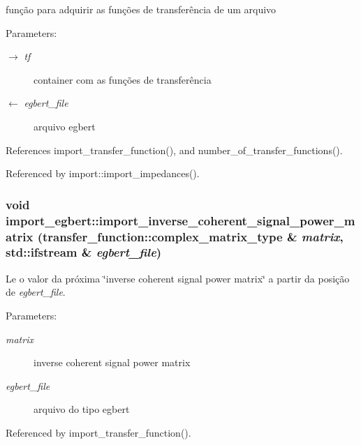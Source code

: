 função para adquirir as funções de transferência de um arquivo 

\begin{Desc}
\item[Parameters:]
\begin{description}
\item[\mbox{$\rightarrow$} {\em tf}]container com as funções de transferência \item[\mbox{$\leftarrow$} {\em egbert\_\-file}]arquivo egbert \end{description}
\end{Desc}


References import\_\-transfer\_\-function(), and number\_\-of\_\-transfer\_\-functions().

Referenced by import::import\_\-impedances().
\subsubsection{\setlength{\rightskip}{0pt plus 5cm}void import\_\-egbert::import\_\-inverse\_\-coherent\_\-signal\_\-power\_\-matrix (transfer\_\-function::complex\_\-matrix\_\-type \& {\em matrix}, \/  std::ifstream \& {\em egbert\_\-file})}\label{namespaceimport__egbert_27ca661a9f34ba331e928c034bcae7e3}


Le o valor da próxima \char`\"{}inverse coherent signal power matrix\char`\"{} a partir da posição de {\em egbert\_\-file\/}. 

\begin{Desc}
\item[Parameters:]
\begin{description}
\item[{\em matrix}]inverse coherent signal power matrix \item[{\em egbert\_\-file}]arquivo do tipo egbert \end{description}
\end{Desc}


Referenced by import\_\-transfer\_\-function().
